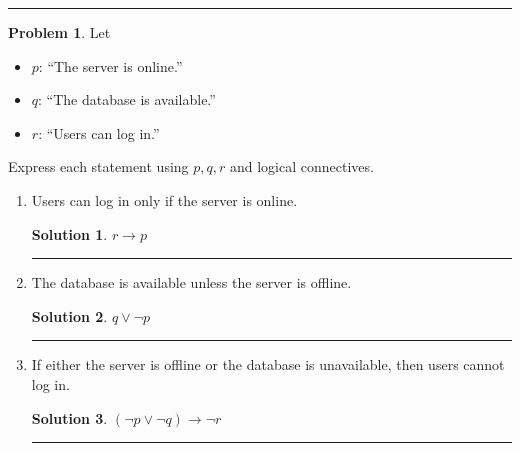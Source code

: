 \documentclass{article}
\theoremstyle{definition}
\newtheorem{problem}{Problem}
\def\fline{\rule{0.75\linewidth}{0.5pt}}
\newcommand{\finishline}{\begin{center}\fline\end{center}}
\newtheorem*{solution*}{Solution}
\newenvironment{solution}{\begin{solution*}}{{\finishline} \end{solution*}}
\begin{document}
\finishline
\newpage


\newpage



\bigskip



\begin{problem}
Let
\begin{itemize}
    \item $p$: ``The server is online.''
    \item $q$: ``The database is available.''
    \item $r$: ``Users can log in.''
\end{itemize}

Express each statement using $p,q,r$ and logical connectives.

\begin{enumerate}[label=\alph*)]
    \item Users can log in only if the server is online.

    \begin{solution}

       $r \rightarrow p$

    \end{solution}

    \item The database is available unless the server is offline.

    \begin{solution}

    $q \lor \neg p$

    \end{solution}

    \item If either the server is offline or the database is unavailable,
    then users cannot log in.

    \begin{solution}

        $(\neg p \lor \neg q) \rightarrow \neg r$

    \end{solution}


\end{enumerate}
\end{problem}
\end{document}
